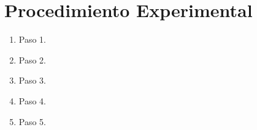 
\section{Procedimiento Experimental}


\begin{enumerate}
    \item Paso 1.
    \item Paso 2.
    \item Paso 3.
    \item Paso 4.
    \item Paso 5.
\end{enumerate}
